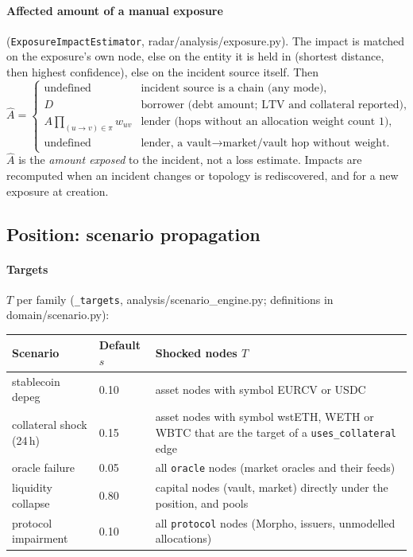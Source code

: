 \documentclass[11pt,a4paper]{article}
\newcommand{\code}[1]{\texttt{#1}}
\newcommand{\src}[1]{\textsf{\small #1}}
\begin{document}
\paragraph{Affected amount of a manual exposure} (\code{ExposureImpactEstimator},
\src{radar/analysis/exposure.py}). The impact is matched on the exposure's own
node, else on the entity it is held in (shortest distance, then highest
confidence), else on the incident source itself. Then
\begin{equation}
\hat A=\begin{cases}
\text{undefined} & \text{incident source is a chain (any mode)},\\
D & \text{borrower (debt amount; LTV and collateral reported)},\\
A\prod_{(u\to v)\in\pi}w_{uv} & \text{lender (hops without an allocation weight count 1)},\\
\text{undefined} & \text{lender, a vault}\to\text{market/vault hop without weight.}
\end{cases}
\end{equation}
$\hat A$ is the \emph{amount exposed} to the incident, not a loss estimate.
Impacts are recomputed when an incident changes or topology is rediscovered, and
for a new exposure at creation.

\subsection{Position: scenario propagation}

\paragraph{Targets} $T$ per family (\code{\_targets},
\src{analysis/scenario\_engine.py}; definitions in \src{domain/scenario.py}):
\begin{center}\small
\begin{tabularx}{\textwidth}{@{}L{3.0cm}L{1.6cm}Y@{}}
\toprule
Scenario & Default $s$ & Shocked nodes $T$ \\
\midrule
stablecoin depeg & 0.10 & asset nodes with symbol EURCV or USDC \\
collateral shock (24\,h) & 0.15 & asset nodes with symbol wstETH, WETH or WBTC that are the target of a \code{uses\_collateral} edge \\
oracle failure & 0.05 & all \code{oracle} nodes (market oracles and their feeds) \\
liquidity collapse & 0.80 & capital nodes (vault, market) directly under the position, and pools \\
protocol impairment & 0.10 & all \code{protocol} nodes (Morpho, issuers, unmodelled allocations) \\
\bottomrule
\end{tabularx}
\end{center}
\end{document}
